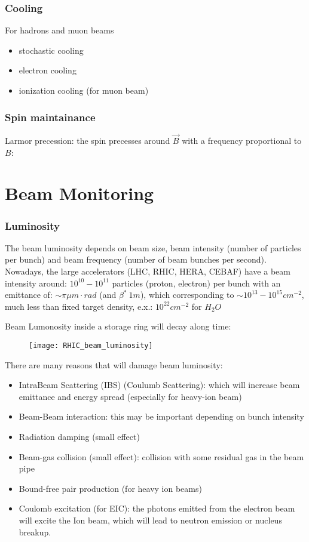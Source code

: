 \subsubsection{Cooling}
For hadrons and muon beams
\begin{itemize}
    \item stochastic cooling
    \item electron cooling
    \item ionization cooling (for muon beam)
\end{itemize}

\subsubsection{Spin maintainance}
Larmor precession: the spin precesses around $\vec{B}$ with a frequency 
proportional to $B$:


\section{Beam Monitoring}

\subsubsection{Luminosity}
The beam luminosity depends on beam size, beam intensity (number of particles
per bunch) and beam frequency (number of beam bunches per second). Nowadays,
the large accelerators (LHC, RHIC, HERA, CEBAF) have a beam intensity around:
$10^{10} - 10^{11}$ particles (proton, electron) per bunch with an emittance of:
$\sim \pi\mu m \cdot rad$ (and $\beta^* ~ 1 m$), which corresponding to 
$\sim 10^{13} - 10^{15} cm^{-2}$, much less than fixed target density, 
e.x.: $10^{22} cm^{-2}$ for $H_2O$

Beam Lumonosity inside a storage ring will decay along time:
\begin{figure}
    \texttt{[image: RHIC\_beam\_luminosity]}
\end{figure}

There are many reasons that will damage beam luminosity:
\begin{itemize}
    \item IntraBeam Scattering (IBS) (Coulumb Scattering): which will increase
	beam emittance and energy spread (especially for heavy-ion beam)
    \item Beam-Beam interaction: this may be important depending on bunch intensity
    \item Radiation damping (small effect)
    \item Beam-gas collision (small effect): collision with some residual gas 
	in the beam pipe
    \item Bound-free pair production (for heavy ion beams)
    \item Coulomb excitation (for EIC): the photons emitted from the electron
	beam will excite the Ion beam, which will lead to neutron emission or
	nucleus breakup.
\end{itemize}

